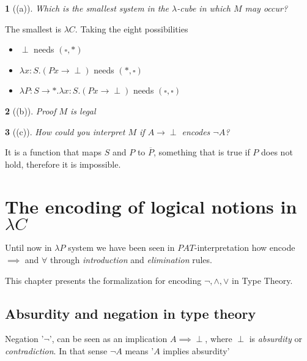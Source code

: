 \documentclass[12pt, a4paper]{article}
\newtheorem*{exercise}{}
\begin{document}
\begin{exercise}[(a)]
    Which is the smallest system in the $\lambda$-cube in which $M$ may occur?
\end{exercise}
The smallest is $\lambda C$. Taking the eight possibilities
\begin{itemize}
    \item $\perp$ needs $(\square, *)$
    \item $\lambda x : S. (P x \to \perp)$ needs $(*, \square)$
    \item $\lambda P : S \to *. \lambda x : S. (P x \to \perp)$ needs $(\square, \square)$
\end{itemize}

\begin{exercise}[(b)]
    Proof $M$ is legal
\end{exercise}
\begin{flagderiv}
    \step{}{\perp : *}{}
\end{flagderiv}

\begin{exercise}[(c)]
    How could you interpret $M$ if $A \to \perp$ encodes $\neg A$?
\end{exercise}
It is a function that maps $S$ and $P$ to $\overline{P}$, something that is true if $P$ does not hold, therefore it is impossible.

\section{The encoding of logical notions in \texorpdfstring{$\lambda C$}{}}
Until now in $\lambda P$ system we have been seen in $PAT$-interpretation how encode $\implies$ and $\forall$ through \textit{introduction} and \textit{elimination}
rules.

This chapter presents the formalization for encoding $\neg, \land, \lor$ in Type Theory.
\subsection{Absurdity and negation in type theory}
Negation '$\neg$', can be seen as an implication $A \implies \perp$, where $\perp$ is \textit{absurdity} or \textit{contradiction}.
In that sense $\neg A$ means '$A$ implies absurdity'
\end{document}
